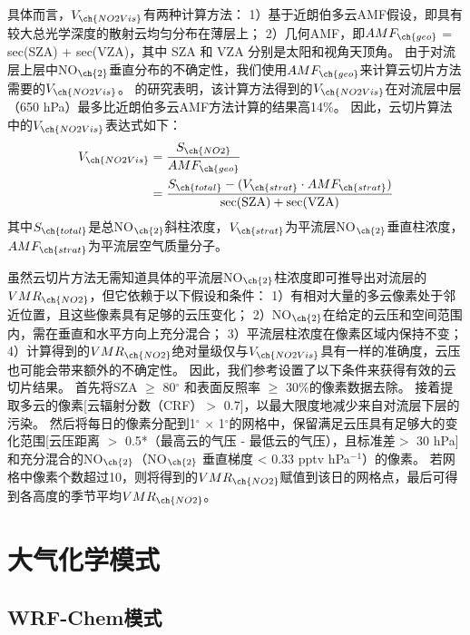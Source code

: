 具体而言，$V_{\ch{NO2Vis}}$有两种计算方法：
1）基于近朗伯多云AMF假设，即具有较大总光学深度的散射云均匀分布在薄层上\citep{Choi.2014}；
2）几何AMF，即$AMF_{\ch{geo}}$ = sec(SZA) + sec(VZA)，其中 SZA 和 VZA 分别是太阳和视角天顶角\citep{Marais.2018,Marais.2021}。
由于对流层上层中NO$_{\ch{2}}$垂直分布的不确定性\citep{Travis.2016}，我们使用$AMF_{\ch{geo}}$来计算云切片方法需要的$V_{\ch{NO2Vis}}$。
\citet{Choi.2014}的研究表明，该计算方法得到的$V_{\ch{NO2Vis}}$在对流层中层（650 hPa）最多比近朗伯多云AMF方法计算的结果高14\%。
因此，云切片算法中的$V_{\ch{NO2Vis}}$表达式如下：
\begin{equation} \label{eq:AMF_geo}
\begin{split}
V_{\ch{NO2Vis}} & = \frac{S_{\ch{NO2}}}{AMF_{\ch{geo}}} \\
             & = \frac{S_{\ch{total}}-(V_{\ch{strat}} \cdot AMF_{\ch{strat}})}{\sec (\mathrm{SZA})+\sec (\mathrm{VZA})}
\end{split}
\end{equation}
其中$S_{\ch{total}}$是总NO$_{\ch{2}}$斜柱浓度，$V_{\ch{strat}}$为平流层NO$_{\ch{2}}$垂直柱浓度，$AMF_{\ch{strat}}$为平流层空气质量分子。


虽然云切片方法无需知道具体的平流层NO$_{\ch{2}}$柱浓度即可推导出对流层的$VMR_{\ch{NO2}}$，但它依赖于以下假设和条件：
1）有相对大量的多云像素处于邻近位置，且这些像素具有足够的云压变化；
2）NO$_{\ch{2}}$在给定的云压和空间范围内，需在垂直和水平方向上充分混合；
3）平流层柱浓度在像素区域内保持不变；
4）计算得到的$VMR_{\ch{NO2}}$绝对量级仅与$V_{\ch{NO2Vis}}$具有一样的准确度，云压也可能会带来额外的不确定性。
因此，我们参考\citet{Marais.2021}设置了以下条件来获得有效的云切片结果。
首先将SZA $\geq$ 80$^{\circ}$ 和表面反照率 $\geq$  30\%的像素数据去除。
接着提取多云的像素[云辐射分数（CRF）$>$ 0.7]，以最大限度地减少来自对流层下层的污染。
然后将每日的像素分配到1$^{\circ}$ $\times$ 1$^{\circ}$的网格中，保留满足云压具有足够大的变化范围[云压距离 $>$ 0.5*（最高云的气压 - 最低云的气压），且标准差$>$ 30 hPa]和充分混合的NO$_{\ch{2}}$（NO$_{\ch{2}}$ 垂直梯度 < 0.33 pptv hPa$^{-1}$）的像素。
若网格中像素个数超过10，则将得到的$VMR_{\ch{NO2}}$赋值到该日的网格点，最后可得到各高度的季节平均$VMR_{\ch{NO2}}$。

\section{大气化学模式}

\subsection{WRF-Chem模式}


